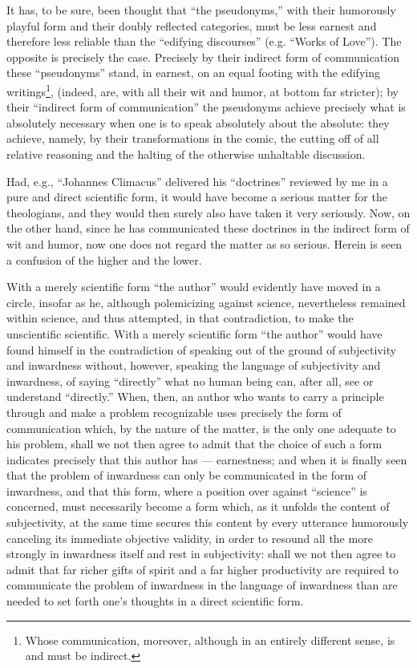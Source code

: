 \documentclass[12pt,a4paper,openany]{book}
\newcommand{\opage}[1]{\marginnote{\footnotesize\textit{[#1]}}}
\begin{document}
It has, to be sure, been thought that ``the pseudonyms,'' with
their humorously playful form and their doubly reflected
categories, must be less earnest and therefore less
reliable than the ``edifying discourses'' (e.g. ``Works
of Love''). The opposite is precisely the case. Precisely by %
their indirect form of communication these ``pseudonyms'' stand,
in earnest, on an equal footing with the edifying writings\footnote[1]{Whose communication, moreover, although in an entirely different sense, is and must be indirect.},
(indeed, are, with all their wit and humor, at bottom far stricter);
by their ``indirect form of communication'' the
\setcounter{footnote}{0}%
\opage{72}pseudonyms achieve precisely what is absolutely necessary when one
is to speak absolutely about the absolute: they achieve, namely, by
their transformations in the comic, the cutting off of all relative
reasoning and the halting of the otherwise unhaltable discussion.


Had, e.g., ``Johannes Climacus'' delivered his ``doctrines''
reviewed by me in a pure and direct scientific
form, it would have become a serious matter for the theologians,
and they would then surely also have taken it very
seriously. Now, on the other hand, since he has communicated these doctrines
in the indirect form of wit and humor, now one does not regard
the matter as so serious. Herein is seen a confusion
of the higher and the lower.

With a merely scientific form ``the author''
would evidently have moved in a circle, insofar as he,
although polemicizing against science, nevertheless remained
within science, and thus attempted, in that contradiction,
to make the unscientific scientific. With
a merely scientific form ``the author'' would have found
himself in the contradiction of speaking out of the ground of subjectivity and
inwardness without, however, speaking the language of subjectivity and
inwardness, of saying ``directly'' what no
human being can, after all, see or understand ``directly.'' When, then, an author
who wants to carry a principle through and make a problem
recognizable uses precisely the form of communication which, by
the nature of the matter, is the only one adequate to his problem,
shall we not then agree to admit that the choice
of such a form indicates precisely that this author has
--- earnestness; and when it is finally seen that the problem of inwardness
can only be communicated in the form of inwardness, and
\setcounter{footnote}{0}%
\opage{73}that this form, where a position over against
``science'' is concerned, must necessarily become a form which, as
it unfolds the content of subjectivity, at the same time secures this
content by every utterance humorously canceling its
immediate objective validity, in order to resound all the more strongly %
in inwardness itself and rest in subjectivity: shall we
not then agree to admit that far
richer gifts of spirit and a far higher productivity are required to %
communicate the problem of inwardness in the language of inwardness
than are needed to set forth one's thoughts in a direct
scientific form.
\end{document}
